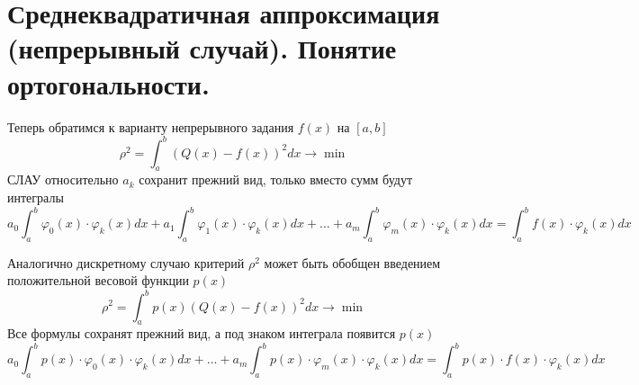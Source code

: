 \section{Среднеквадратичная аппроксимация (непрерывный случай). Понятие ортогональности.}\label{sec:ch14}
Теперь обратимся к варианту непрерывного задания $f(x)$ на $[a, b]$
\begin{equation}
    \rho^2 = \int_a^b \left( Q(x) - f(x) \right)^2 dx \rightarrow \min \label{eq:approx_continuity}
\end{equation}
СЛАУ относительно $a_k$ сохранит прежний вид, только вместо сумм будут интегралы
\begin{equation}
    a_0 \int_{a}^{b} \varphi_0 (x) \cdot \varphi_k (x) dx + a_1 \int_{a}^{b} \varphi_1 (x) \cdot \varphi_k (x) dx + \dots + a_m \int_{a}^{b} \varphi_m (x) \cdot \varphi_k (x) dx = \int_{a}^{b} f(x) \cdot \varphi_k (x) dx \label{eq:approx_eqsys_cont}
\end{equation}

Аналогично дискретному случаю критерий $\displaystyle \rho^2$ может быть обобщен введением положительной весовой функции
$p(x)$
\begin{equation}
    \rho^2 = \int_a^b p(x) \left( Q(x) - f(x) \right)^2 dx \rightarrow \min \label{eq:approx_with_p_cont}
\end{equation}
Все формулы сохранят прежний вид, а под знаком интеграла появится $p(x)$
\begin{equation}
    a_0 \int_{a}^{b} p(x) \cdot \varphi_0 (x) \cdot \varphi_k (x) dx + \dots + a_m \int_{a}^{b} p(x) \cdot \varphi_m (x) \cdot \varphi_k (x) dx = \int_{a}^{b} p(x) \cdot f(x) \cdot \varphi_k (x) dx \label{eq:approx_eqsys_with_p_cont}
\end{equation}

